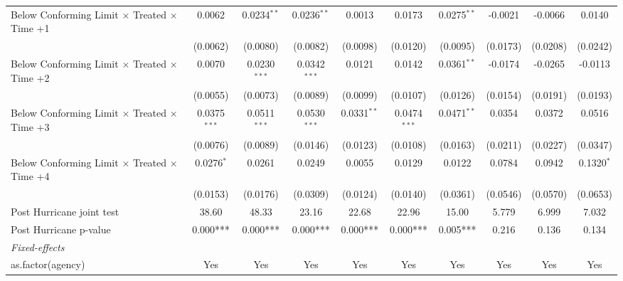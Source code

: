 \begin{tabular}{lccccccccc}
   Below Conforming Limit $\times$ Treated $\times$ Time +1   & 0.0062         & 0.0234$^{**}$   & 0.0236$^{**}$  & 0.0013        & 0.0173         & 0.0275$^{**}$ & -0.0021   & -0.0066   & 0.0140\\   
                                                              & (0.0062)       & (0.0080)        & (0.0082)       & (0.0098)      & (0.0120)       & (0.0095)      & (0.0173)  & (0.0208)  & (0.0242)\\   
   Below Conforming Limit $\times$ Treated $\times$ Time +2   & 0.0070         & 0.0230$^{***}$  & 0.0342$^{***}$ & 0.0121        & 0.0142         & 0.0361$^{**}$ & -0.0174   & -0.0265   & -0.0113\\   
                                                              & (0.0055)       & (0.0073)        & (0.0089)       & (0.0099)      & (0.0107)       & (0.0126)      & (0.0154)  & (0.0191)  & (0.0193)\\   
   Below Conforming Limit $\times$ Treated $\times$ Time +3   & 0.0375$^{***}$ & 0.0511$^{***}$  & 0.0530$^{***}$ & 0.0331$^{**}$ & 0.0474$^{***}$ & 0.0471$^{**}$ & 0.0354    & 0.0372    & 0.0516\\   
                                                              & (0.0076)       & (0.0089)        & (0.0146)       & (0.0123)      & (0.0108)       & (0.0163)      & (0.0211)  & (0.0227)  & (0.0347)\\   
   Below Conforming Limit $\times$ Treated $\times$ Time +4   & 0.0276$^{*}$   & 0.0261          & 0.0249         & 0.0055        & 0.0129         & 0.0122        & 0.0784    & 0.0942    & 0.1320$^{*}$\\   
                                                              & (0.0153)       & (0.0176)        & (0.0309)       & (0.0124)      & (0.0140)       & (0.0361)      & (0.0546)  & (0.0570)  & (0.0653)\\   
   Post Hurricane joint test                                  & 38.60          & 48.33           & 23.16          & 22.68         & 22.96          & 15.00         & 5.779     & 6.999     & 7.032\\  
   Post Hurricane p-value                                     & 0.000***       & 0.000***        & 0.000***       & 0.000***      & 0.000***       & 0.005***      & 0.216     & 0.136     & 0.134\\  
   \midrule
   \emph{Fixed-effects}\\
   as.factor(agency)                                          & Yes            & Yes             & Yes            & Yes           & Yes            & Yes           & Yes       & Yes       & Yes\\  

\end{tabular}

